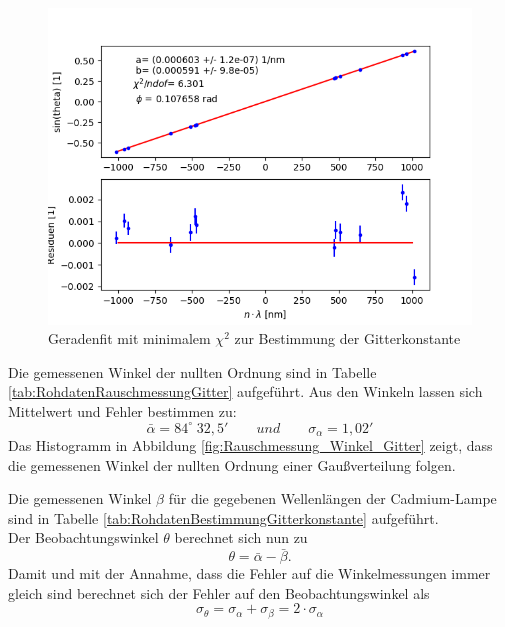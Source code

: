 \documentclass[12pt,a4paper]{article}
\begin{document}
	\begin{figure}
		\begin{center}
			\includegraphics[scale=0.9]{Bilder/Anpassung_Gitterkonstante.png}
		\end{center}
		\caption[Fit Gitterkonstante]{Geradenfit mit minimalem $\chi ^2$ zur Bestimmung der Gitterkonstante}
		\label{fig:Fit_Gitterkonstante}
	\end{figure}
	
	Die gemessenen Winkel der nullten Ordnung sind in Tabelle \ref{tab:RohdatenRauschmessungGitter} aufgeführt. Aus den Winkeln lassen sich Mittelwert und Fehler bestimmen zu:
	\begin{equation*}
	\bar{\alpha} = 84^{\circ} \; 32,5' \qquad und \qquad \sigma_{\alpha} = 1,02'
	\end{equation*}
	Das Histogramm in Abbildung \ref{fig:Rauschmessung_Winkel_Gitter} zeigt, dass die gemessenen Winkel der nullten Ordnung einer Gaußverteilung folgen.
	
	Die gemessenen Winkel $\beta$ für die gegebenen Wellenlängen der Cadmium-Lampe sind in Tabelle \ref{tab:RohdatenBestimmungGitterkonstante} aufgeführt.\\
	Der Beobachtungswinkel $\theta$ berechnet sich nun zu 
	\begin{equation}
	\theta = \bar{\alpha} - \bar{\beta}.
	\end{equation}
	Damit und mit der Annahme, dass die Fehler auf die Winkelmessungen immer gleich sind berechnet sich der Fehler auf den Beobachtungswinkel als
	\begin{equation}
	\sigma _{\theta} = \sigma _{\alpha} + \sigma _{\beta} = 2 \cdot \sigma _{\alpha}
	\end{equation}
	
\end{document}
